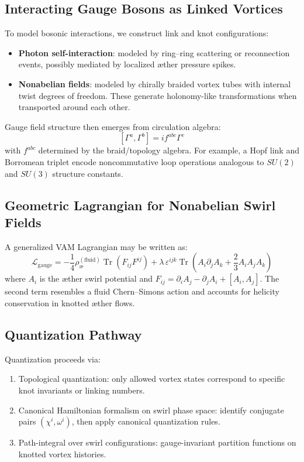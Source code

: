         \subsection{Interacting Gauge Bosons as Linked Vortices}

            To model bosonic interactions, we construct link and knot configurations:
            \begin{itemize}
                \item \textbf{Photon self-interaction}: modeled by ring–ring scattering or reconnection events, possibly mediated by localized æther pressure spikes.
                \item \textbf{Nonabelian fields}: modeled by chirally braided vortex tubes with internal twist degrees of freedom. These generate holonomy-like transformations when transported around each other.
            \end{itemize}

            Gauge field structure then emerges from circulation algebra:
            \[
                [\Gamma^a, \Gamma^b] = i f^{abc} \Gamma^c
            \]
            with \( f^{abc} \) determined by the braid/topology algebra. For example, a Hopf link and Borromean triplet encode noncommutative loop operations analogous to \( SU(2) \) and \( SU(3) \) structure constants.

        \subsection{Geometric Lagrangian for Nonabelian Swirl Fields}

            A generalized VAM Lagrangian may be written as:
            \[
                \mathcal{L}_{\text{gauge}} = -\frac{1}{4} \rho_\text{\ae}^{(\text{fluid})} \operatorname{Tr}(F_{ij} F^{ij}) + \lambda \, \varepsilon^{ijk} \operatorname{Tr}\left(A_i \partial_j A_k + \frac{2}{3} A_i A_j A_k \right)
            \]
            where \( A_i \) is the æther swirl potential and \( F_{ij} = \partial_i A_j - \partial_j A_i + [A_i, A_j] \). The second term resembles a fluid Chern–Simons action and accounts for helicity conservation in knotted æther flows.

        \subsection{Quantization Pathway}

            Quantization proceeds via:
            \begin{enumerate}
                \item Topological quantization: only allowed vortex states correspond to specific knot invariants or linking numbers.
                \item Canonical Hamiltonian formalism on swirl phase space: identify conjugate pairs \( (\chi^i, \omega^i) \), then apply canonical quantization rules.
                \item Path-integral over swirl configurations: gauge-invariant partition functions on knotted vortex histories.
            \end{enumerate}

